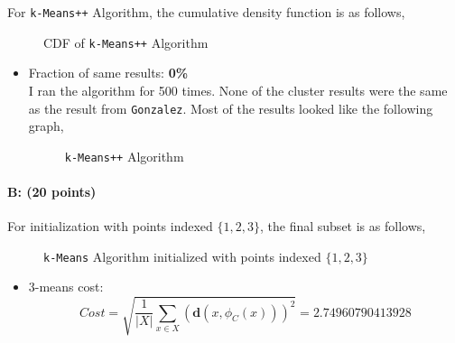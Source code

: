\documentclass[11pt]{article}
\begin{document}
For \texttt{k-Means++} Algorithm, the cumulative density function is as follows,
\begin{figure}[H]
\caption{CDF of \texttt{k-Means++} Algorithm}
\label{fig:name}
\end{figure}
\begin{itemize}
\item Fraction of same results: \textbf{0\%}\\
I ran the algorithm for 500 times. None of the cluster results were the same as the result from \texttt{Gonzalez}. Most of the results looked like the following graph,
\begin{figure}[H]
\caption{\texttt{k-Means++} Algorithm}
\label{fig:name}
\end{figure}
\end{itemize}

\newpage

\paragraph{B: (20 points)}
For initialization with points indexed $\{1,2,3\}$, the final subset is as follows,
\begin{figure}[H]
\caption{\texttt{k-Means} Algorithm initialized with points indexed $\{1,2,3\}$}
\label{fig:name}
\end{figure}
\begin{itemize}
\item 3-means cost:
$$Cost=\sqrt{\frac{1}{|X|}\sum_{x\in X}(\mathbf{d}(x, \phi_C(x)))^2}=2.74960790413928$$
\end{itemize}
\end{document}
